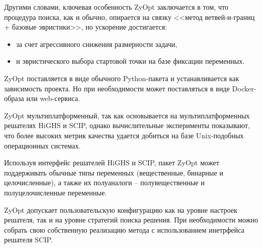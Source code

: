\documentclass[%
	11pt,
	a4paper,
	utf8,
		]{article}
\begin{document}
Другими словами, ключевая особенность ZyOpt заключается в том, что процедура поиска, как и обычно, опирается на связку <<метод ветвей-и-границ + базовые эвристики>>, но ускорение достигается:
\begin{itemize}
	\item за счет агрессивного снижения размерности задачи,
	
	\item и эвристического выбора стартовой точки на базе фиксации переменных.
\end{itemize}

ZyOpt поставляется в виде обычного Python-пакета и устанавливается как зависимость проекта. Но при необходимости может поставляться в виде Docker-образа или web-сервиса.

ZyOpt мультиплатформенный, так как основывается на мультиплатформенных решателях HiGHS и SCIP, однако вычислительные эксперименты показывают, что более высоких метрик качества удается добиться на базе Unix-подобных операционных системах.

Используя интерфейс решателей HiGHS и SCIP, пакет ZyOpt может поддерживать обычные типы переменных (вещественные, бинарные и целочисленные), а также их полуаналоги -- полувещественные и полуцелочисленные переменные.

ZyOpt допускает пользовательскую конфигурацию как на уровне настроек решателя, так и на уровне стратегий поиска решения. При необходимости можно собрать свою собственную реализацию метода с использованием инетрфейса решателя SCIP.

\newcommand\ccb[1]{\cellcolor{red!10}{#1}}
\newcommand\ccg[1]{\cellcolor{green!10}{#1}}
\end{document}

